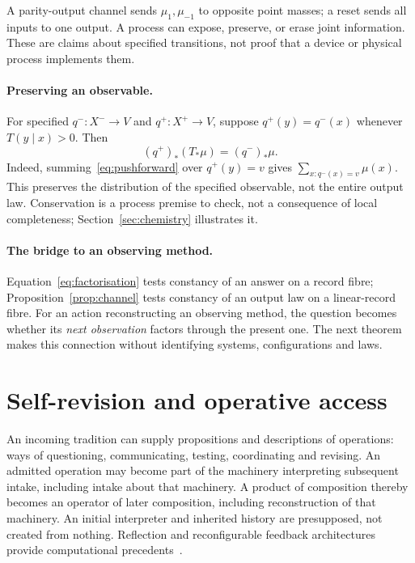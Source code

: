 \documentclass[11pt]{article}
\begin{document}
A parity-output channel sends $\mu_1,\mu_{-1}$ to opposite point masses; a reset sends all inputs to one output. A process can expose, preserve, or erase joint information. These are claims about specified transitions, not proof that a device or physical process implements them.

\paragraph{Preserving an observable.}\label{par:conservation}
For specified $q^-:X^-\to V$ and $q^+:X^+\to V$, suppose $q^+(y)=q^-(x)$ whenever $T(y\mid x)>0$. Then
\begin{equation}\label{eq:conservation}
(q^+)_*(T_*\mu)=(q^-)_*\mu.
\end{equation}
Indeed, summing~\eqref{eq:pushforward} over $q^+(y)=v$ gives $\sum_{x:q^-(x)=v}\mu(x)$. This preserves the distribution of the specified observable, not the entire output law. Conservation is a process premise to check, not a consequence of local completeness; Section~\ref{sec:chemistry} illustrates it.

\paragraph{The bridge to an observing method.}\label{par:bridge}
Equation~\eqref{eq:factorisation} tests constancy of an answer on a record fibre; Proposition~\ref{prop:channel} tests constancy of an output law on a linear-record fibre. For an action reconstructing an observing method, the question becomes whether its \emph{next observation} factors through the present one. The next theorem makes this connection without identifying systems, configurations and laws.

\section{Self-revision and operative access}\label{sec:self}
An incoming tradition can supply propositions and descriptions of operations: ways of questioning, communicating, testing, coordinating and revising. An admitted operation may become part of the machinery interpreting subsequent intake, including intake about that machinery. A product of composition thereby becomes an operator of later composition, including reconstruction of that machinery. An initial interpreter and inherited history are presupposed, not created from nothing. Reflection and reconfigurable feedback architectures provide computational precedents~\cite{foote,vogel}.
\end{document}
